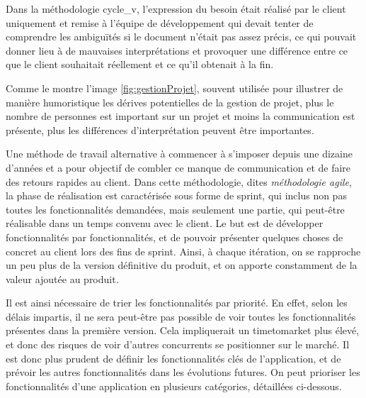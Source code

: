 Dans la méthodologie \gls{cycle_v}, l'expression du besoin était réalisé par le client uniquement et remise à l'équipe de développement qui devait tenter de comprendre les ambiguïtés si le document n'était pas assez précis, ce qui pouvait donner lieu à de mauvaises interprétations et provoquer une différence entre ce que le client souhaitait réellement et ce qu'il obtenait à la fin. 


Comme le montre l'image \ref{fig:gestionProjet}, souvent utilisée pour illustrer de manière humoristique les dérives potentielles de la gestion de projet, plus le nombre de personnes est important sur un projet et moins la communication est présente, plus les différences d'interprétation peuvent être importantes. 

Une méthode de travail alternative à commencer à s'imposer depuis une dizaine d'années et a pour objectif de combler ce manque de communication et de faire des retours rapides au client. Dans cette méthodologie, dites \emph{méthodologie agile}, la phase de réalisation est caractérisée sous forme de sprint, qui inclus non pas toutes les fonctionnalités demandées, mais seulement une partie, qui peut-être réalisable dans un temps convenu avec le client. Le but est de développer fonctionnalités par fonctionnalités, et de pouvoir présenter quelques choses de concret au client lors des fins de sprint. Ainsi, à chaque itération, on se rapproche un peu plus de la version définitive du produit, et on apporte constamment de la valeur ajoutée au produit.

Il est ainsi nécessaire de trier les fonctionnalités par priorité. En effet, selon les délais impartis, il ne sera peut-être pas possible de voir toutes les fonctionnalités présentes dans la première version. Cela impliquerait un \gls{timetomarket} plus élevé, et donc des risques de voir d'autres concurrents se positionner sur le marché. Il est donc plus prudent de définir les fonctionnalités clés de l'application, et de prévoir les autres fonctionnalités dans les évolutions futures. On peut prioriser les fonctionnalités d'une application en plusieurs catégories, détaillées ci-dessous.

